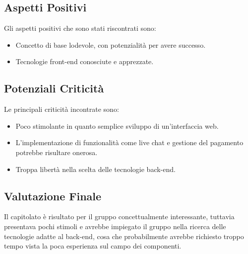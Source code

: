 \subsection{Aspetti Positivi}
	Gli aspetti positivi che sono stati riscontrati sono:
	\begin{itemize}
	\item Concetto di base lodevole, con potenzialità per avere successo.
	\item Tecnologie front-end conosciute e apprezzate.
	\end{itemize}

\subsection{Potenziali Criticità}
	Le principali criticità incontrate sono:
	\begin{itemize}
		\item Poco stimolante in quanto semplice sviluppo di un'interfaccia web.
		\item L'implementazione di funzionalità come live chat e gestione del pagamento potrebbe risultare onerosa.
		\item Troppa libertà nella scelta delle tecnologie back-end.  
	\end{itemize}

\subsection{Valutazione Finale}
	Il capitolato è risultato per il gruppo concettualmente interessante, tuttavia presentava pochi stimoli e avrebbe impiegato il gruppo nella ricerca delle tecnologie adatte al back-end, cosa che probabilmente avrebbe richiesto troppo tempo vista la poca esperienza sul campo dei componenti.